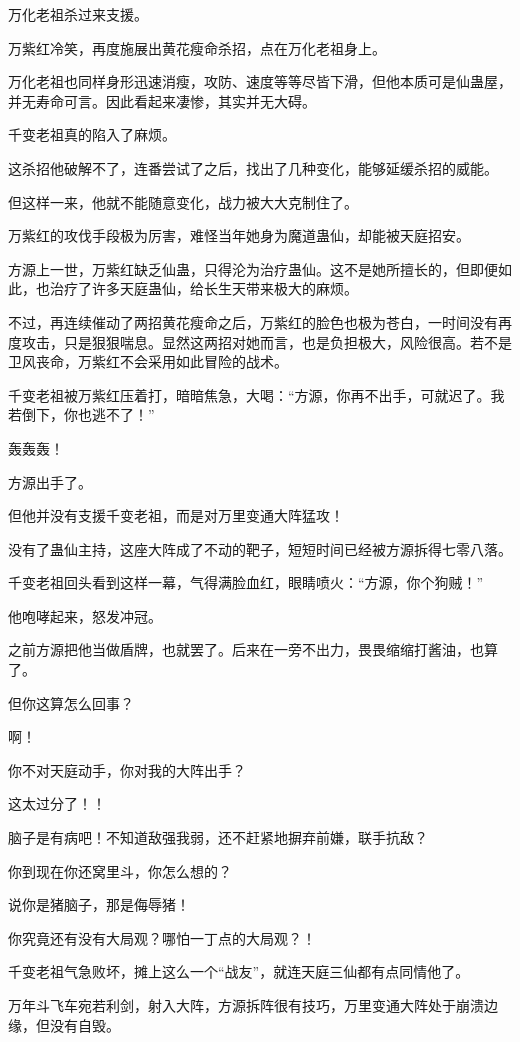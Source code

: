 \begin{this_body}
万化老祖杀过来支援。

万紫红冷笑，再度施展出黄花瘦命杀招，点在万化老祖身上。

万化老祖也同样身形迅速消瘦，攻防、速度等等尽皆下滑，但他本质可是仙蛊屋，并无寿命可言。因此看起来凄惨，其实并无大碍。

千变老祖真的陷入了麻烦。

这杀招他破解不了，连番尝试了之后，找出了几种变化，能够延缓杀招的威能。

但这样一来，他就不能随意变化，战力被大大克制住了。

万紫红的攻伐手段极为厉害，难怪当年她身为魔道蛊仙，却能被天庭招安。

方源上一世，万紫红缺乏仙蛊，只得沦为治疗蛊仙。这不是她所擅长的，但即便如此，也治疗了许多天庭蛊仙，给长生天带来极大的麻烦。

不过，再连续催动了两招黄花瘦命之后，万紫红的脸色也极为苍白，一时间没有再度攻击，只是狠狠喘息。显然这两招对她而言，也是负担极大，风险很高。若不是卫风丧命，万紫红不会采用如此冒险的战术。

千变老祖被万紫红压着打，暗暗焦急，大喝：“方源，你再不出手，可就迟了。我若倒下，你也逃不了！”

轰轰轰！

方源出手了。

但他并没有支援千变老祖，而是对万里变通大阵猛攻！

没有了蛊仙主持，这座大阵成了不动的靶子，短短时间已经被方源拆得七零八落。

千变老祖回头看到这样一幕，气得满脸血红，眼睛喷火：“方源，你个狗贼！”

他咆哮起来，怒发冲冠。

之前方源把他当做盾牌，也就罢了。后来在一旁不出力，畏畏缩缩打酱油，也算了。

但你这算怎么回事？

啊！

你不对天庭动手，你对我的大阵出手？

这太过分了！！

脑子是有病吧！不知道敌强我弱，还不赶紧地摒弃前嫌，联手抗敌？

你到现在你还窝里斗，你怎么想的？

说你是猪脑子，那是侮辱猪！

你究竟还有没有大局观？哪怕一丁点的大局观？！

千变老祖气急败坏，摊上这么一个“战友”，就连天庭三仙都有点同情他了。

万年斗飞车宛若利剑，射入大阵，方源拆阵很有技巧，万里变通大阵处于崩溃边缘，但没有自毁。


\end{this_body}
